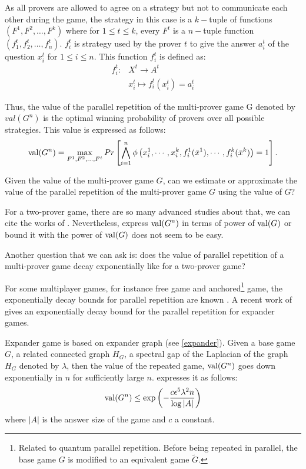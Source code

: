 As  all provers are allowed to agree on a strategy but not to communicate each other during the game, the strategy in this case is a $k-$tuple of functions $(F^1,F^2, \ldots, F^k)$ where for $1\leq t \leq k$, every $F^t$ is a $n-$tuple function $(f_1^t, f_2^t, \ldots, f_n^t)$. $f_i^t$ is strategy used by the prover $t$ to give the answer $a_i^t$ of the question $x_i^t$ for $1\leq i \leq n$. This function $f_i^t$ is defined as:
\begin{align*}
f_i^t: & X^t \longrightarrow A^t \\ & x_i^t \longmapsto f_i^t(x_i^t)=a_i^t
\end{align*} 

Thus, the value of the parallel repetition of the multi-prover game G denoted by $val(G^n)$ is the optimal winning probability of provers over all possible strategies. This value is expressed as follows: 
$$ \mathrm{val} (G^n)= \max_{F^1,F^2, \ldots, F^t} Pr \left[  \bigwedge\limits_{i=1}^n \phi \left( x_i^1, \cdots , x_i^k, f_i^1(\bar{x}^1), \cdots ,  f_i^k(\bar{x}^k) \right)=1 \right].$$


Given the value of the multi-prover game $G$, can we estimate or approximate the value of the parallel repetition of the multi-prover game $G$ using the value of $G$? 

For a two-prover game, there are so many advanced studies about that, we can cite the works of \cite{feige1992two, verbitsky1996towards,raz1998parallel, holenstein2007parallel, barak2009strong,raz2010parallel, rao2011parallel,dinur2014analytical}.  Nevertheless, express $\mathrm{val} (G^n)$  in terms of power of $\mathrm{val} (G)$ or bound it with the power of $\mathrm{val} (G)$ does not seem to be easy.

 Another question that we can ask is: does the value of parallel repetition of a multi-prover game decay exponentially like for a two-prover game?

For some multiplayer games, for instance free game and anchored\footnote{ Related to quantum parallel repetition. Before being repeated in parallel, the base game $G$ is modified to an equivalent game $\tilde{G}$.} game, the exponentially decay bounds for parallel repetition are known \citep{barak2009strong,bavarian2015anchoring}.  A recent work of \cite{dinur2016multiplayer} gives an exponentially decay bound for the parallel repetition for  expander games. 

Expander game is based on expander graph (see \eqref{expander}).  Given a base game $G$, a related connected graph $H_G$, a spectral gap of the Laplacian of the graph $H_G$ denoted by $\lambda$,  then the value of the repeated game, $\mathrm{val} (G^n)$  goes down exponentially in $n$ for sufficiently large $n$. \cite{dinur2016multiplayer} expresses it as follows:
\begin{align}
\mathrm{val} (G^n) \leq \exp \left(-\frac{c \epsilon^5 \lambda^2 n }{\log |A|}\right) \label{exp}
\end{align}
where $|A|$ is the answer size of the game and $c$ a constant.

